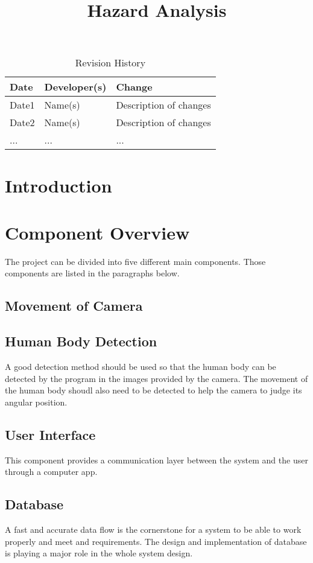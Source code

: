 \documentclass{article}
\title{Hazard Analysis\\\progname}
\author{\authname}
\date{}
\begin{document}
\begin{table}[hp]
\caption{Revision History} \label{TblRevisionHistory}
\begin{tabularx}{\textwidth}{llX}
\toprule
\textbf{Date} & \textbf{Developer(s)} & \textbf{Change}\\
\midrule
Date1 & Name(s) & Description of changes\\
Date2 & Name(s) & Description of changes\\
... & ... & ...\\
\bottomrule
\end{tabularx}
\end{table}

\newpage

\maketitle

\newpage


\tableofcontents

\newpage
\section{Introduction}

\section{Component Overview}
The project can be divided into five different main components. Those components are listed in the paragraphs below. 
\subsection{Movement of Camera}
\subsection{Human Body Detection}
A good detection method should be used so that the human body can be detected by the program in the images provided by the camera. The movement of the human body shoudl also need to be detected to help the camera to judge its angular position. 
\subsection{User Interface}
This component provides a communication layer between the system and the user through a computer app.
\subsection{Database}
A fast and accurate data flow is the cornerstone for a system to be able to work properly and meet and requirements. The design and implementation of database is playing a major role in the whole system design.
\end{document}
